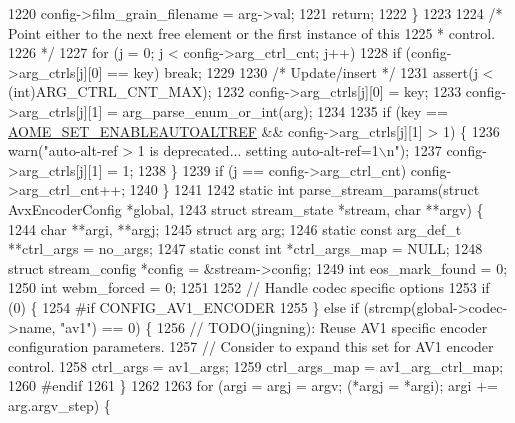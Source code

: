 \begin{DoxyCodeInclude}
{{{{{{{{{{{{{{{{1220     config->film\_grain\_filename = arg->val;
1221     \textcolor{keywordflow}{return};
1222   \}
1223 
1224   \textcolor{comment}{/* Point either to the next free element or the first instance of this}
1225 \textcolor{comment}{   * control.}
1226 \textcolor{comment}{   */}
1227   \textcolor{keywordflow}{for} (j = 0; j < config->arg\_ctrl\_cnt; j++)
1228     \textcolor{keywordflow}{if} (config->arg\_ctrls[j][0] == key) \textcolor{keywordflow}{break};
1229 
1230   \textcolor{comment}{/* Update/insert */}
1231   assert(j < (\textcolor{keywordtype}{int})ARG\_CTRL\_CNT\_MAX);
1232   config->arg\_ctrls[j][0] = key;
1233   config->arg\_ctrls[j][1] = arg\_parse\_enum\_or\_int(arg);
1234 
1235   \textcolor{keywordflow}{if} (key == \hyperlink{group__aom__encoder_ggae78dde67a6d78f332e9bdba0dde42db5ac8a24393f214823f5a6bd345afb840b6}{AOME\_SET\_ENABLEAUTOALTREF} && config->arg\_ctrls[j][1] > 1) \{
1236     warn(\textcolor{stringliteral}{"auto-alt-ref > 1 is deprecated... setting auto-alt-ref=1\(\backslash\)n"});
1237     config->arg\_ctrls[j][1] = 1;
1238   \}
1239   \textcolor{keywordflow}{if} (j == config->arg\_ctrl\_cnt) config->arg\_ctrl\_cnt++;
1240 \}
1241 
1242 \textcolor{keyword}{static} \textcolor{keywordtype}{int} parse\_stream\_params(\textcolor{keyword}{struct} AvxEncoderConfig *global,
1243                                \textcolor{keyword}{struct} stream\_state *stream, \textcolor{keywordtype}{char} **argv) \{
1244   \textcolor{keywordtype}{char} **argi, **argj;
1245   \textcolor{keyword}{struct }arg arg;
1246   \textcolor{keyword}{static} \textcolor{keyword}{const} arg\_def\_t **ctrl\_args = no\_args;
1247   \textcolor{keyword}{static} \textcolor{keyword}{const} \textcolor{keywordtype}{int} *ctrl\_args\_map = NULL;
1248   \textcolor{keyword}{struct }stream\_config *config = &stream->config;
1249   \textcolor{keywordtype}{int} eos\_mark\_found = 0;
1250   \textcolor{keywordtype}{int} webm\_forced = 0;
1251 
1252   \textcolor{comment}{// Handle codec specific options}
1253   \textcolor{keywordflow}{if} (0) \{
1254 \textcolor{preprocessor}{#if CONFIG\_AV1\_ENCODER}
1255   \} \textcolor{keywordflow}{else} \textcolor{keywordflow}{if} (strcmp(global->codec->name, \textcolor{stringliteral}{"av1"}) == 0) \{
1256     \textcolor{comment}{// TODO(jingning): Reuse AV1 specific encoder configuration parameters.}
1257     \textcolor{comment}{// Consider to expand this set for AV1 encoder control.}
1258     ctrl\_args = av1\_args;
1259     ctrl\_args\_map = av1\_arg\_ctrl\_map;
1260 \textcolor{preprocessor}{#endif}
1261   \}
1262 
1263   \textcolor{keywordflow}{for} (argi = argj = argv; (*argj = *argi); argi += arg.argv\_step) \{
}}}}}}}}}}}}}}}}
\end{DoxyCodeInclude}
